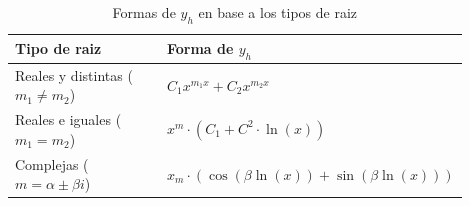 \begin{table}[H]
\centering
\caption{Formas de $y_{h}$ en base a los tipos de raiz}
\begin{threeparttable}
{
\begin{tabular}{p{0.45\linewidth}p{0.45\linewidth}}\hline
    \textbf{Tipo de raiz} & \textbf{Forma de $y_{h}$} \\ \hline

    Reales y distintas ($m_{1} \neq m_{2}$) & $C_{1}x^{m_{1}x} + C_{2}x^{m_{2}x}$ \\
    Reales e iguales ($m_{1} = m_{2}$) & $x^{m} \cdot (C_{1} + C^{2} \cdot \ln{(x)})$ \\
    Complejas ($m = \alpha \pm \beta i$) & $x_{m} \cdot (\cos{(\beta \ln{(x)})} + \sin{(\beta \ln{(x)})})$ \\

    \hline
\end{tabular}
}
\begin{tablenotes} %
    \item[] 
\end{tablenotes}
\end{threeparttable}
\label{tab:eq_cauchy_euler}
\end{table}
